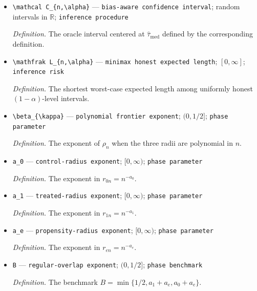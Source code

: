 \documentclass{article}
\begin{document}
\begin{itemize}
  \par\smallskip\noindent\emph{Definition.} \texttt{A fixed noncoverage probability.}
  \item \texttt{\textbackslash{}\allowbreak{}mathcal C\_\allowbreak{}\{n,\allowbreak{}\textbackslash{}\allowbreak{}alpha\}\allowbreak{}} --- \texttt{bias-\allowbreak{}aware confidence interval}; random intervals in \(\mathbb R\); \texttt{inference procedure}
  \par\smallskip\noindent\emph{Definition.} The oracle interval centered at \(\widehat\tau_{\mathrm{med}}\) defined by the corresponding definition.
  \item \texttt{\textbackslash{}\allowbreak{}mathfrak L\_\allowbreak{}\{n,\allowbreak{}\textbackslash{}\allowbreak{}alpha\}\allowbreak{}} --- \texttt{minimax honest expected length}; \([0,\infty]\); \texttt{inference risk}
  \par\smallskip\noindent\emph{Definition.} The shortest worst-case expected length among uniformly honest \((1-\alpha)\)-level intervals.
  \item \texttt{\textbackslash{}\allowbreak{}beta\_\allowbreak{}\{\textbackslash{}\allowbreak{}kappa\}\allowbreak{}} --- \texttt{polynomial frontier exponent}; \((0,1/2]\); \texttt{phase parameter}
  \par\smallskip\noindent\emph{Definition.} The exponent of \(\rho_n\) when the three radii are polynomial in \(n\).
  \item \texttt{a\_\allowbreak{}0} --- \texttt{control-\allowbreak{}radius exponent}; \([0,\infty)\); \texttt{phase parameter}
  \par\smallskip\noindent\emph{Definition.} The exponent in \(r_{0n}=n^{-a_0}\).
  \item \texttt{a\_\allowbreak{}1} --- \texttt{treated-\allowbreak{}radius exponent}; \([0,\infty)\); \texttt{phase parameter}
  \par\smallskip\noindent\emph{Definition.} The exponent in \(r_{1n}=n^{-a_1}\).
  \item \texttt{a\_\allowbreak{}e} --- \texttt{propensity-\allowbreak{}radius exponent}; \([0,\infty)\); \texttt{phase parameter}
  \par\smallskip\noindent\emph{Definition.} The exponent in \(r_{en}=n^{-a_e}\).
  \item \texttt{B} --- \texttt{regular-\allowbreak{}overlap exponent}; \((0,1/2]\); \texttt{phase benchmark}
  \par\smallskip\noindent\emph{Definition.} The benchmark \(B=\min\{1/2,a_1+a_e,a_0+a_e\}\).

\end{itemize}
\end{document}
